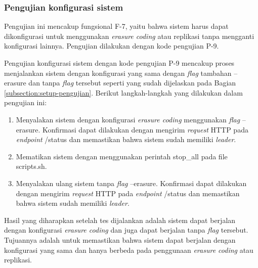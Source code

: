 \subsubsection{Pengujian konfigurasi sistem}
\label{subsubsection:pengujian-konfigurasi-sistem}

Pengujian ini mencakup fungsional F-7, yaitu bahwa sistem harus dapat dikonfigurasi untuk menggunakan \textit{erasure coding} atau replikasi tanpa mengganti konfigurasi lainnya. Pengujian dilakukan dengan kode pengujian P-9.

Pengujian konfigurasi sistem dengan kode pengujian P-9 mencakup proses menjalankan sistem dengan konfigurasi yang sama dengan \textit{flag} tambahan --erasure dan tanpa \textit{flag} tersebut seperti yang sudah dijelaskan pada Bagian \ref{subsection:setup-pengujian}. Berikut langkah-langkah yang dilakukan dalam pengujian ini:

\begin{enumerate}
	\item Menyalakan sistem dengan konfigurasi \textit{erasure coding} menggunakan \textit{flag} --erasure. Konfirmasi dapat dilakukan dengan mengirim \textit{request} HTTP pada \textit{endpoint} /status dan memastikan bahwa sistem sudah memiliki \textit{leader}.
	\item Mematikan sistem dengan menggunakan perintah stop\_all pada file scripts.sh.
	\item Menyalakan ulang sistem tanpa \textit{flag} --erasure. Konfirmasi dapat dilakukan dengan mengirim \textit{request} HTTP pada \textit{endpoint} /status dan memastikan bahwa sistem sudah memiliki \textit{leader}.
\end{enumerate}

Hasil yang diharapkan setelah tes dijalankan adalah sistem dapat berjalan dengan konfigurasi \textit{erasure coding} dan juga dapat berjalan tanpa \textit{flag} tersebut. Tujuannya adalah untuk memastikan bahwa sistem dapat berjalan dengan konfigurasi yang sama dan hanya berbeda pada penggunaan \textit{erasure coding} atau replikasi.